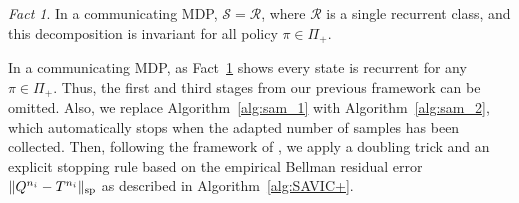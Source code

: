 \documentclass{article}
\theoremstyle{definition}
\theoremstyle{remark}
\newtheorem{fact}{Fact}
\newcommand{\real}{\mathbb{R}}
\newcommand{\cA}{\mathcal{A}}
\newcommand{\cS}{\mathcal{S}}
\newcommand{\cR}{\mathcal{R}}
\renewcommand{\sp}[1]{\|{#1}\|_\text{\rm sp}}
\begin{document}
\begin{fact}\label{fact:com}
In a communicating MDP, $\cS = \cR$, where $\cR$ is a single recurrent class, and this decomposition is invariant for all policy $\pi \in \Pi_+$.
\end{fact}

In a communicating MDP, as Fact~\ref{fact:com} shows every state is recurrent for any $\pi \in \Pi_+$. Thus, the first and third stages from our previous framework can be omitted. Also, we replace Algorithm~\ref{alg:sam_1} with Algorithm~\ref{alg:sam_2}, which automatically stops when the adapted number of samples has been collected. Then, following the framework of \citep{lee2025near}, we apply a doubling trick and an explicit stopping rule based on the empirical Bellman residual error $\sp{Q^{n_i}-T^{n_i}}$ as described in Algorithm~\ref{alg:SAVIC+}.
\end{document}
